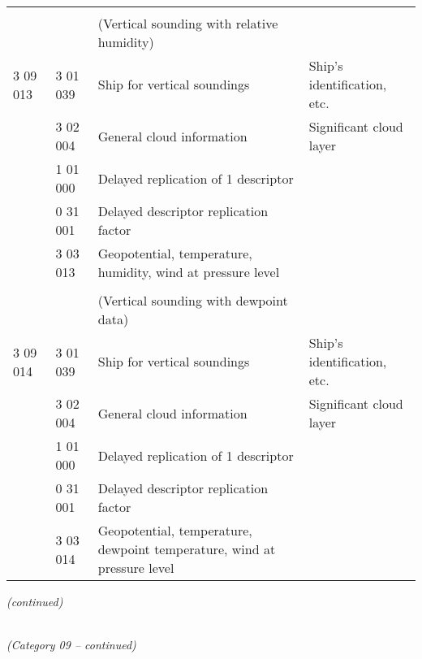 \begin{longtable}[]{@{}llll@{}}
& & &\tabularnewline
& & (Vertical sounding with relative humidity) &\tabularnewline
3 09 013 & 3 01 039 & Ship for vertical soundings & Ship's identification, etc.\tabularnewline
& 3 02 004 & General cloud information & Significant cloud layer\tabularnewline
& 1 01 000 & Delayed replication of 1 descriptor &\tabularnewline
& 0 31 001 & Delayed descriptor replication factor &\tabularnewline
& 3 03 013 & Geopotential, temperature, humidity, wind at pressure level &\tabularnewline
& & &\tabularnewline
& & (Vertical sounding with dewpoint data) &\tabularnewline
3 09 014 & 3 01 039 & Ship for vertical soundings & Ship's identification, etc.\tabularnewline
& 3 02 004 & General cloud information & Significant cloud layer\tabularnewline
& 1 01 000 & Delayed replication of 1 descriptor &\tabularnewline
& 0 31 001 & Delayed descriptor replication factor &\tabularnewline
& 3 03 014 & Geopotential, temperature, dewpoint temperature, wind at pressure level &\tabularnewline
\bottomrule
\end{longtable}

\emph{(continued)}

\emph{\\
(Category 09 -- continued)}

